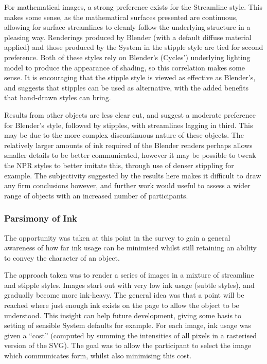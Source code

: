 For mathematical images, a strong preference exists for the Streamline style.
This makes some sense, as the mathematical surfaces presented are continuous, allowing for surface streamlines to cleanly follow the underlying structure in a pleasing way.
Renderings produced by Blender (with a default diffuse material applied) and those produced by the System in the stipple style are tied for second preference.
Both of these styles rely on Blender's (Cycles') underlying lighting model to produce the appearance of shading, so this correlation makes some sense.
It is encouraging that the stipple style is viewed as effective as Blender's, and suggests that stipples can be used as alternative, with the added benefits that hand-drawn styles can bring.

Results from other objects are less clear cut, and suggest a moderate preference for Blender's style, followed by stipples, with streamlines lagging in third.
This may be due to the more complex discontinuous nature of these objects.
The relatively larger amounts of ink required of the Blender renders perhaps allows smaller details to be better communicated, however it may be possible to tweak the NPR styles to better imitate this, through use of denser stippling for example.
The subjectivity suggested by the results here makes it difficult to draw any firm conclusions however, and further work would useful to assess a wider range of objects with an increased number of participants.

\subsubsection{Parsimony of Ink}

The opportunity was taken at this point in the survey to gain a general awareness of how far ink usage can be minimised whilst still retaining an ability to convey the character of an object.

The approach taken was to render a series of images in a mixture of streamline and stipple styles. 
Images start out with very low ink usage (subtle styles), and gradually become more ink-heavy.
The general idea was that a point will be reached where just enough ink exists on the page to allow the object to be understood.
This insight can help future development, giving some basis to setting of sensible System defaults for example.
For each image, ink usage was given a ``cost'' (computed by summing the intensities of all pixels in a rasterised version of the SVG).
The goal was to allow the participant to select the image which communicates form, whilst also minimising this cost.

